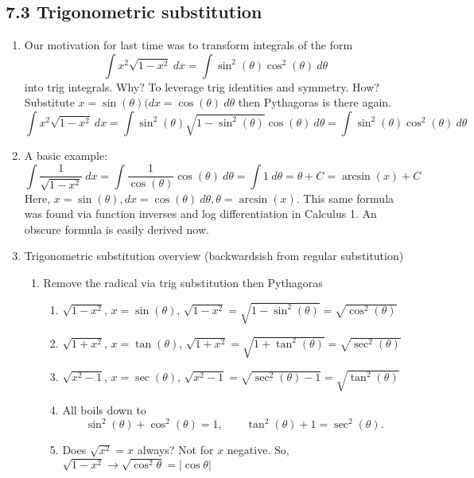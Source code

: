 \documentclass{article}
\begin{document}
\subsection{7.3 Trigonometric substitution}
\begin{enumerate}

\item Our motivation for last time was to transform integrals of the form
\[
\int x^2\sqrt{1-x^2} ~dx = \int \sin^2(\theta)\cos^2(\theta)~d\theta
\]
into trig integrals. Why? To leverage trig identities and symmetry. How? Substitute $x = \sin(\theta) (dx = \cos(\theta)~d\theta$ then Pythagoras is there again.
\[
\int x^2\sqrt{1-x^2} ~dx = \int \sin^2(\theta)\sqrt{1-\sin^2(\theta)} \cos(\theta)~d\theta = \int \sin^2(\theta)\cos^2(\theta)~d\theta
\]

\item A basic example:
\[
\int \frac{1}{\sqrt{1-x^2}}~dx = \int \frac{1}{\cos(\theta)}\cos(\theta)~d\theta = \int 1 ~d\theta = \theta + C = \arcsin(x)+C
\]
Here, $x=\sin(\theta), dx=\cos(\theta)~d\theta, \theta = \arcsin(x)$.
This same formula was found via function inverses and log differentiation in Calculus 1.
An obscure formula is easily derived now.

\item Trigonometric substitution overview (backwardsish from regular substitution)
\begin{enumerate}
\item Remove the radical via trig substitution then Pythagoras
\begin{enumerate}
\item $\sqrt{1-x^2}$, \quad $x = \sin(\theta)$, \quad $\sqrt{1-x^2}=\sqrt{1-\sin^2(\theta)} = \sqrt{\cos^2(\theta)}$
\item $\sqrt{1+x^2}$, \quad $x = \tan(\theta)$, \quad $\sqrt{1+x^2}=\sqrt{1+\tan^2(\theta)} = \sqrt{\sec^2(\theta)}$
\item $\sqrt{x^2-1}$, \quad $x = \sec(\theta)$, \quad $\sqrt{x^2-1}=\sqrt{\sec^2(\theta)-1} = \sqrt{\tan^2(\theta)}$
\item All boils down to 
\[
\sin^2(\theta) + \cos^2(\theta) = 1, \quad\quad \tan^2(\theta)+1=\sec^2(\theta).
\]
\item Does $\sqrt{x^2}=x$ always? Not for $x$ negative. So, $\sqrt{1-x^2}\rightarrow \sqrt{\cos^2\theta} = |\cos\theta|$
\end{enumerate}


\end{enumerate}
\end{enumerate}
\end{document}

